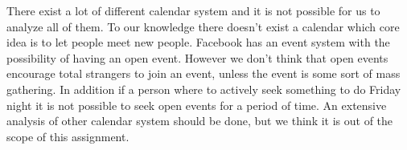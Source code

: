There exist a lot of different calendar system and it is not possible for us to analyze all of them.
To our knowledge there doesn't exist a calendar which core idea is to let people meet new people. 
Facebook has an event system with the possibility of having an open event. However we don't think that open events encourage total strangers to join an event, unless the event is some sort of mass gathering. 
In addition if a person where to actively seek something to do Friday night it is not possible to seek open events for a period of time. 
An extensive analysis of other calendar system should be done, but we think it is out of the scope of this assignment.